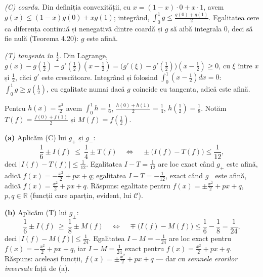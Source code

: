 \emph{(C) coarda.} Din definiția convexității, cu $x=(1-x)\cdot0+x\cdot1$, avem $g(x)\le(1-x)g(0)+xg(1)$; integrând, $\int_0^1g\le\frac{g(0)+g(1)}{2}$. Egalitatea cere ca diferența continuă și nenegativă dintre coardă și $g$ să aibă integrala $0$, deci să fie nulă (Teorema 4.20): $g$ este afină.

\emph{(T) tangenta în $\frac12$.} Din Lagrange, $g(x)-g(\tfrac12)-g'(\tfrac12)(x-\tfrac12)=\bigl(g'(\xi)-g'(\tfrac12)\bigr)(x-\tfrac12)\ge0$, cu $\xi$ între $x$ și $\frac12$, căci $g'$ este crescătoare. Integrând și folosind $\int_0^1(x-\frac12)dx=0$: $\int_0^1g\ge g(\frac12)$, cu egalitate numai dacă $g$ coincide cu tangenta, adică este afină.

Pentru $h(x)=\frac{x^{2}}{2}$ avem $\int_0^1h=\frac16$, $\frac{h(0)+h(1)}{2}=\frac14$, $h(\frac12)=\frac18$. Notăm $T(f)=\frac{f(0)+f(1)}{2}$ și $M(f)=f(\frac12)$.

\noindent\textbf{(a)} Aplicăm (C) lui $g_{+}$ și $g_{-}$:
\[ \frac16\pm I(f)\ \le\ \frac14\pm T(f)\quad\Longleftrightarrow\quad \pm\bigl(I(f)-T(f)\bigr)\le\frac1{12} , \]
deci $|I(f)-T(f)|\le\frac1{12}$. Egalitatea $I-T=\frac1{12}$ are loc exact când $g_{+}$ este afină, adică $f(x)=-\frac{x^{2}}{2}+px+q$; egalitatea $I-T=-\frac1{12}$, exact când $g_{-}$ este afină, adică $f(x)=\frac{x^{2}}{2}+px+q$. Răspuns: egalitate pentru $f(x)=\pm\frac{x^{2}}{2}+px+q$, $p,q\in\mathbb{R}$ (funcții care aparțin, evident, lui $\mathcal{C}$).

\noindent\textbf{(b)} Aplicăm (T) lui $g_{\pm}$:
\[ \frac16\pm I(f)\ \ge\ \frac18\pm M(f)\quad\Longleftrightarrow\quad \mp\bigl(I(f)-M(f)\bigr)\le\frac16-\frac18=\frac1{24} , \]
deci $|I(f)-M(f)|\le\frac1{24}$. Egalitatea $I-M=-\frac1{24}$ are loc exact pentru $f(x)=-\frac{x^{2}}{2}+px+q$, iar $I-M=\frac1{24}$ exact pentru $f(x)=\frac{x^{2}}{2}+px+q$. Răspuns: aceleași funcții, $f(x)=\pm\frac{x^{2}}{2}+px+q$ --- dar cu \emph{semnele erorilor inversate} față de (a).

